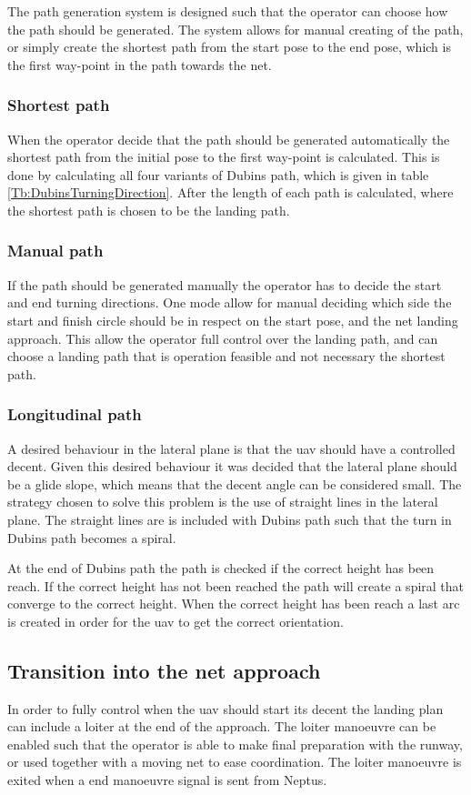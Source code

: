 The path generation system is designed such that the operator can choose how the path should be generated. The system allows for manual creating of the path, or simply create the shortest path from the start pose to the end pose, which is the first way-point in the path towards the net.
\subsubsection{Shortest path}
When the operator decide that the path should be generated automatically the shortest path from the initial pose to the first way-point is calculated. This is done by calculating all four variants of Dubins path, which is given in table \ref{Tb:DubinsTurningDirection}. After the length of each path is calculated, where the shortest path is chosen to be the landing path.
\subsubsection{Manual path}
If the path should be generated manually the operator has to decide the start and end turning directions.
One mode allow for manual deciding which side the start and finish circle should be in respect on the start pose, and the net landing approach. This allow the operator full control over the landing path, and can choose a landing path that is operation feasible and not necessary the shortest path.
\subsubsection{Longitudinal path}
A desired behaviour in the lateral plane is that the \gls{uav} should have a controlled decent. Given this desired behaviour it was decided that the lateral plane should be a glide slope, which means that the decent angle can be considered small. The strategy chosen to solve this problem is the use of straight lines in the lateral plane. The straight lines are is included with Dubins path such that the turn in Dubins path becomes a spiral.

At the end of Dubins path the path is checked if the correct height has been reach. If the correct height has not been reached the path will create a spiral that converge to the correct height. When the correct height has been reach a last arc is created in order for the \gls{uav} to get the correct orientation.
\subsection{Transition into the net approach}
In order to fully control when the \gls{uav} should start its decent the landing plan can include a loiter at the end of the approach. The loiter manoeuvre can be enabled such that the operator is able to make final preparation with the runway, or used together with a moving net to ease coordination. The loiter manoeuvre is exited when a end manoeuvre signal is sent from Neptus.
